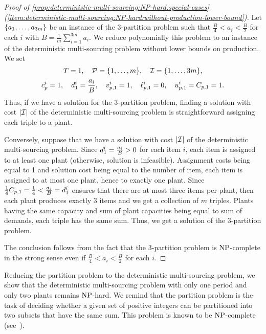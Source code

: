 \begin{proof}[Proof of \cref{prop:deterministic-multi-sourcing:NP-hard:special-cases} (\cref{item:deterministic-multi-sourcing:NP-hard:without-production-lower-bound})]
Let $\crbracket{a_1,\ldots,a_{3m}}$ be an instance of the 3-partition problem such that $\frac{B}{4} < a_i < \frac{B}{2}$ for each $i$ with $B=\frac{1}{m}\sum_{i=1}^{3m}a_i$.
We reduce polynomially this problem to an instance of the deterministic multi-sourcing problem without lower bounds on production.
We set
$$
  \horizon=1
  ,\quad
  \plants=\range[1]{m}
  ,\quad
  \REF=\range[1]{3m},
$$
$$
  c_p^i=1
  ,\quad
  d_1^i=\frac{a_i}{B}
  ,\quad
  v_{p,1}^i=1
  ,\quad
  \ell_{p,1}^i=0
  ,\quad
  u_{p,1}^i=C_{p,1}=1.
$$
Thus, if we have a solution for the 3-partition problem, finding a solution with cost $\card{\REF}$ of the deterministic multi-sourcing problem is straightforward assigning each triple to a plant.


Conversely, suppose that we have a solution with cost $\card{\REF}$ of the deterministic multi-sourcing problem.
Since $d_1^i=\frac{a_i}{B}>0$ for each item $i$, each item is assigned to at least one plant (otherwise, solution is infeasible).
Assignment costs being equal to 1 and solution cost being equal to the number of item, each item is assigned to at most one plant, hence to exactly one plant.
Since $\frac{1}{4}C_{p,1}=\frac{1}{4} < \frac{a_i}{B} = d_1^i$ ensures that there are at most three items per plant, then each plant produces exactly 3 items and we get a collection of $m$ triples.
Plants having the same capacity and sum of plant capacities being equal to sum of demands, each triple has the same sum.
Thus, we get a solution of the 3-partition problem.


The conclusion follows from the fact that the 3-partition problem is $\operatorname{NP}$-complete in the strong sense even if $\frac{B}{4} < a_i < \frac{B}{2}$ for each $i$.
\end{proof}


Reducing the partition problem to the deterministic multi-sourcing problem, we show that the deterministic multi-sourcing problem with only one period and only two plants remains $\operatorname{NP}$-hard.
We remind that the partition problem is the task of deciding whether a given set of positive integers can be partitioned into two subsets that have the same sum.
This problem is known to be $\operatorname{NP}$-complete (see~\citet{Garey1979}).


